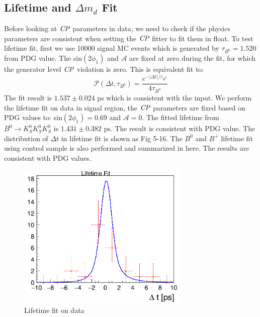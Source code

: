 \subsection{Lifetime and $\Delta m_d$ Fit}
Before looking at $\it{CP}$ parameters in data, we need to check if the physics parameters are consistent when setting the $\it{CP}$ fitter to fit them in float. To test lifetime fit, first we use 10000 signal MC events which is generated by $\tau_{B^0} = 1.520$ from PDG value. The sin$(2\phi_1)$ and $\mathcal{A}$ are fixed at zero during the fit, for which the generator level $\it{CP}$ violation is zero. This is equivalent fit to:
\begin{equation}
\mathcal{P}(\Delta t,\tau_{B^0}) = 
\frac{e^{-|\Delta t|/\tau_{B^0}}}{4\tau_{B^0}}
\end{equation}
The fit result is $1.537 \pm 0.024$ ps which is consistent with the input. We perform the lifetime fit on data in signal region, the $\it{CP}$ parameters are fixed based on PDG values to: sin$(2\phi_1)=0.69$ and $\mathcal{A} = 0$. The fitted lifetime from $B^0 \to K_S^0  K_S^0  K_S^0$ is $1.431\pm 0.382$ ps. The result is consistent with PDG value. The distribution of $\Delta t$ in lifetime fit is shown as Fig 5-16.
The $B^0$ and $B^+$ lifetime fit using control sample is also performed and summarized in here\cite{jpsiks_ichep}. The results are consistent with PDG values. 
\begin{figure}[H]
	\centering
	\includegraphics[height=7cm]{figures/lifetime_data}
	\caption{Lifetime fit on data}
\end{figure}


